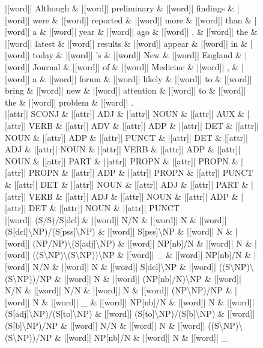 \documentclass[10pt,a4paper]{article}
\begin{document}
\begin{figure}[h]
{\begin{dependency}[theme = simple]
\begin{deptext}[column sep=1em, row sep=0.1em]
|[word]| Although \& |[word]| preliminary \& |[word]| findings \& |[word]| were \& |[word]| reported \& |[word]| more \& |[word]| than \& |[word]| a \& |[word]| year \& |[word]| ago \& |[word]| , \& |[word]| the \& |[word]| latest \& |[word]| results \& |[word]| appear \& |[word]| in \& |[word]| today \& |[word]| 's \& |[word]| New \& |[word]| England \& |[word]| Journal \& |[word]| of \& |[word]| Medicine \& |[word]| , \& |[word]| a \& |[word]| forum \& |[word]| likely \& |[word]| to \& |[word]| bring \& |[word]| new \& |[word]| attention \& |[word]| to \& |[word]| the \& |[word]| problem \& |[word]| . \\
|[attr]| SCONJ \& |[attr]| ADJ \& |[attr]| NOUN \& |[attr]| AUX \& |[attr]| VERB \& |[attr]| ADV \& |[attr]| ADP \& |[attr]| DET \& |[attr]| NOUN \& |[attr]| ADP \& |[attr]| PUNCT \& |[attr]| DET \& |[attr]| ADJ \& |[attr]| NOUN \& |[attr]| VERB \& |[attr]| ADP \& |[attr]| NOUN \& |[attr]| PART \& |[attr]| PROPN \& |[attr]| PROPN \& |[attr]| PROPN \& |[attr]| ADP \& |[attr]| PROPN \& |[attr]| PUNCT \& |[attr]| DET \& |[attr]| NOUN \& |[attr]| ADJ \& |[attr]| PART \& |[attr]| VERB \& |[attr]| ADJ \& |[attr]| NOUN \& |[attr]| ADP \& |[attr]| DET \& |[attr]| NOUN \& |[attr]| PUNCT \\
|[word]| (S/S)/S{[}dcl{]} \& |[word]| N/N \& |[word]| N \& |[word]| (S{[}dcl{]}\textbackslash{}NP)/(S{[}pss{]}\textbackslash{}NP) \& |[word]| S{[}pss{]}\textbackslash{}NP \& |[word]| N \& |[word]| (NP/NP)\textbackslash{}(S{[}adj{]}\textbackslash{}NP) \& |[word]| NP{[}nb{]}/N \& |[word]| N \& |[word]| ((S\textbackslash{}NP)\textbackslash{}(S\textbackslash{}NP))\textbackslash{}NP \& |[word]| \_ \& |[word]| NP{[}nb{]}/N \& |[word]| N/N \& |[word]| N \& |[word]| S{[}dcl{]}\textbackslash{}NP \& |[word]| ((S\textbackslash{}NP)\textbackslash{}(S\textbackslash{}NP))/NP \& |[word]| N \& |[word]| (NP{[}nb{]}/N)\textbackslash{}NP \& |[word]| N/N \& |[word]| N/N \& |[word]| N \& |[word]| (NP\textbackslash{}NP)/NP \& |[word]| N \& |[word]| \_ \& |[word]| NP{[}nb{]}/N \& |[word]| N \& |[word]| (S{[}adj{]}\textbackslash{}NP)/(S{[}to{]}\textbackslash{}NP) \& |[word]| (S{[}to{]}\textbackslash{}NP)/(S{[}b{]}\textbackslash{}NP) \& |[word]| (S{[}b{]}\textbackslash{}NP)/NP \& |[word]| N/N \& |[word]| N \& |[word]| ((S\textbackslash{}NP)\textbackslash{}(S\textbackslash{}NP))/NP \& |[word]| NP{[}nb{]}/N \& |[word]| N \& |[word]| \_ \\
\end{deptext}


\end{dependency}}
\end{figure}
\end{document}
